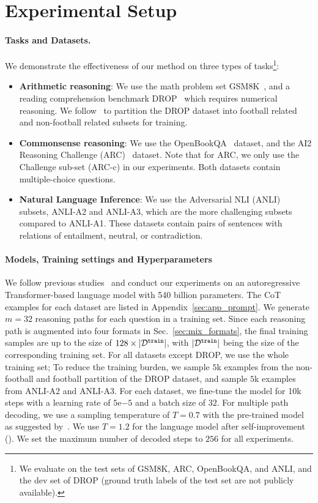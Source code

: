 \section{Experimental Setup}\label{sec:setup}

\paragraph{Tasks and Datasets.} 
We demonstrate the effectiveness of our method on three types of tasks\footnote{We evaluate on the test sets of GSM8K, ARC, OpenBookQA, and ANLI, and the dev set of DROP (ground truth labels of the test set are not publicly available).}:
\begin{itemize}[leftmargin=*]
\item \textbf{Arithmetic reasoning}: We use the math problem set GSM8K~\citep{Cobbe2021TrainingVT}, and a reading comprehension benchmark DROP~\citep{Dua2019DROPAR} which requires numerical reasoning. We follow~\cite{Zhou2022LeasttoMostPE} to partition the DROP dataset into football related and non-football related subsets for training.
\item \textbf{Commonsense reasoning}: We use the OpenBookQA~\citep{Mihaylov2018CanAS} dataset, and the AI2 Reasoning Challenge (ARC)~\citep{Clark2018ThinkYH} dataset. Note that for ARC, we only use the Challenge sub-set (ARC-c) in our experiments. Both datasets contain multiple-choice questions.
\item \textbf{Natural Language Inference}: We use the Adversarial NLI (ANLI)~\citep{Mihaylov2018CanAS} subsets, ANLI-A2 and ANLI-A3, which are the more challenging subsets compared to ANLI-A1. These datasets contain pairs of sentences with relations of entailment, neutral, or contradiction. 
\end{itemize}

\paragraph{Models, Training settings and Hyperparameters}
We follow previous studies~\citep{Wei2022ChainOT, Wang2022SelfConsistencyIC} and conduct our experiments on an autoregressive Transformer-based language model with 540 billion parameters. The CoT examples for each dataset are listed in Appendix~\ref{sec:app_prompt}. 
We generate $m=32$ reasoning paths for each question in a training set. Since each reasoning path is augmented into four formats in Sec.~\ref{sec:mix_formats}, the final training samples are up to the size of $128\times |\mathcal{D}^\mathtt{train}|$, with $|\mathcal{D}^\mathtt{train}|$ being the size of the corresponding training set. 
For all datasets except DROP, we use the whole training set; To reduce the training burden, we sample $5$k examples from the non-football and football partition of the DROP dataset, and sample $5$k examples from ANLI-A2 and ANLI-A3.
For each dataset, we fine-tune the model for 10k steps with a learning rate of $5$e$-5$ and a batch size of $32$.
For multiple path decoding, we use a sampling temperature of $T=0.7$ with the pre-trained model as suggested by~\cite{Wang2022SelfConsistencyIC}. We use $T=1.2$ for the language model after self-improvement (\method). We set the maximum number of decoded steps to $256$ for all experiments.


